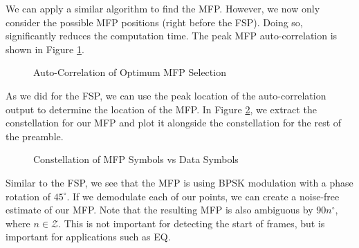 \documentclass[conference,onecolumn]{IEEEtran}
\begin{document}
We can apply a similar algorithm to find the MFP. However, we now only consider the possible MFP positions (right before the FSP). Doing so, significantly reduces the computation time. The peak MFP auto-correlation is shown in Figure \ref{fig::mfp_correlation}.

\begin{figure}[H]
	\centerline{}
	\caption{Auto-Correlation of Optimum MFP Selection}
	\label{fig::mfp_correlation}
\end{figure}

\noindent As we did for the FSP, we can use the peak location of the auto-correlation output to determine the location of the MFP. In Figure \ref{fig::mfp_constellation}, we extract the constellation for our MFP and plot it alongside the constellation for the rest of the preamble.

\begin{figure}[H]
	\centerline{}
	\caption{Constellation of MFP Symbols vs Data Symbols}
	\label{fig::mfp_constellation}
\end{figure}

\noindent Similar to the FSP, we see that the MFP is using BPSK modulation with a phase rotation of $45^{\circ}$. If we demodulate each of our points, we can create a noise-free estimate of our MFP. Note that the resulting MFP is also ambiguous by $90n^{\circ}$, where $n \in \mathcal{Z}$. This is not important for detecting the start of frames, but is important for applications such as EQ.
\end{document}
